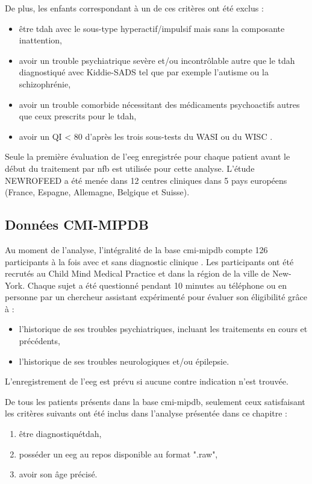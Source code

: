 De plus, les enfants correspondant à un de ces critères ont été exclus :
\begin{itemize}
\item être \gls{tdah} avec le sous-type hyperactif/impulsif mais sans la composante inattention,
\item avoir un trouble psychiatrique sevère et/ou incontrôlable autre que le \gls{tdah} diagnostiqué avec Kiddie-SADS tel que par 
exemple l'autisme ou la schizophrénie,
\item avoir un trouble comorbide nécessitant des médicaments psychoactifs autres que ceux prescrits pour le \gls{tdah},
\item avoir un QI < 80 d'après les trois sous-tests du WASI ou du WISC \citep{Wechsler1999}.
\end{itemize}

Seule la première évaluation de l'\gls{eeg} enregistrée pour chaque patient avant le début du traitement par \gls{nfb} est utilisée pour cette analyse. 
L'étude NEWROFEED a été menée dans 12 centres cliniques dans 5 pays européens (France, Espagne, Allemagne, Belgique et Suisse).

\subsection{Données CMI-MIPDB}
Au moment de l'analyse, l'intégralité de la base \gls{cmi-mipdb} compte 126 participants à la fois avec et sans diagnostic clinique \citep{Langer2017, Langer2017b}.
Les participants ont été recrutés au Child Mind Medical Practice et dans la région de la ville de New-York. Chaque sujet a été questionné pendant 10 minutes
au téléphone ou en personne par un chercheur assistant expérimenté pour évaluer son éligibilité grâce à :
\begin{itemize}
\item l'historique de ses troubles psychiatriques, incluant les traitements en cours et précédents,
\item l'historique de ses troubles neurologiques et/ou épilepsie.
\end{itemize}

L'enregistrement de l'\gls{eeg} est prévu si aucune contre indication n'est trouvée. 

De tous les patients présents dans la base \gls{cmi-mipdb}, seulement ceux satisfaisant les critères suivants ont été inclus dans l'analyse présentée dans ce chapitre :
\begin{enumerate}
\item être diagnostiqué\gls{tdah},
\item posséder un \gls{eeg} au repos disponible au format ".raw",
\item avoir son âge précisé.
\end{enumerate}

